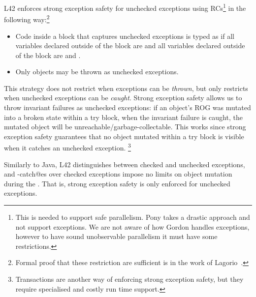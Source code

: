 L42 enforces strong exception safety for unchecked exceptions using RCs\footnote{%
This is needed to support safe parallelism. Pony takes a drastic approach and not support exceptions. 
We are not aware of how Gordon \etal handles exceptions, however to have sound unobservable parallelism it must have some restrictions.%
}
in the following way:\footnote{%
Formal proof that these restriction are sufficient
is in the work of Lagorio~\cite{JOT:issue_2011_01/article1}.
}
\begin{itemize}
\item Code inside a \Q@try@ block that captures unchecked exceptions is typed as 
if all variables declared outside of the block are \Q@final@ and
all \Q@mut@ variables declared outside of the block are \Q@read@ and \Q@final@.
\item Only \Q@imm@ objects may be thrown as unchecked exceptions.
\end{itemize} 
This strategy does not restrict when exceptions can be \emph{thrown}, but only restricts when unchecked exceptions can be \emph{caught}.
Strong exception safety allows us to throw invariant failures as unchecked exceptions: if an object's ROG was mutated into a broken state within a try block, when the invariant failure is caught, the mutated object will be unreachable/garbage-collectable. This works since strong exception safety guarantees that no object mutated within a try block is visible when it catches an unchecked exception.%
\footnote{Transactions are another way of enforcing strong exception safety, but they require specialised and costly run time support.}

Similarly to Java, L42 distinguishes between checked and unchecked exceptions,
and \Q@try-catch@es over checked exceptions impose no limits on object mutation during the \Q@try@.
That is, strong exception safety is only enforced for unchecked exceptions.

